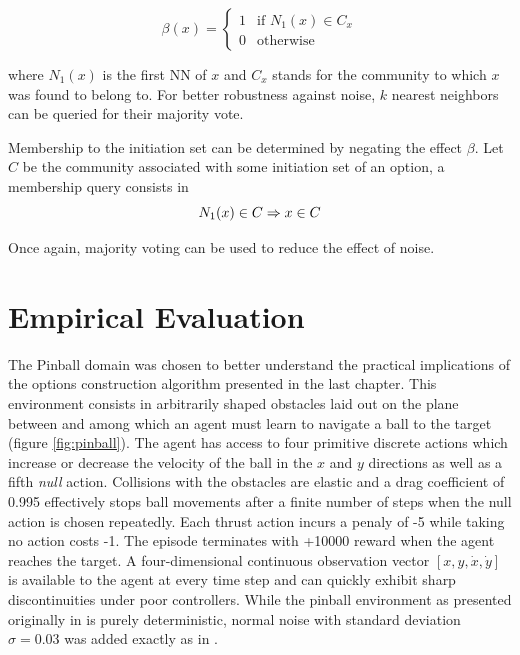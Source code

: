 \documentclass[12pt, oneside, extrafontsizes]{memoir}  %
\theoremstyle{plain}
\theoremstyle{definition}
\begin{document}
\begin{equation}
\beta(x) = 
\begin{cases}
1 & \text{if } N_1(x) \in C_x\\
0 & \text{otherwise}
\end{cases}
\end{equation}

where $N_1(x)$ is the first NN of $x$ and $C_x$ stands for the community to which $x$ was found to belong to. For better robustness against noise, $k$ nearest neighbors can be queried for their majority vote.

Membership to the initiation set can be determined by negating the effect $\beta$. Let $C$ be the community associated with some initiation set of an option, a membership query consists in
\begin{equation}
N_1(x) \in C \Rightarrow x \in C  \\
\end{equation}

Once again, majority voting can be used to reduce the effect of noise. 

\chapter{Empirical Evaluation}
The Pinball domain \cite{Konidaris2009} was chosen to better understand the practical implications of the options construction algorithm presented in the last chapter. This environment consists in arbitrarily shaped obstacles laid out on the plane between and among which an agent must learn to navigate a ball to the target (figure \ref{fig:pinball}). The agent has access to four primitive discrete actions which increase or decrease the velocity of the ball in the $x$ and $y$ directions as well as a fifth \textit{null} action. Collisions with the obstacles are elastic and a drag coefficient of 0.995 effectively stops ball movements after a finite number of steps when the null action is chosen repeatedly. Each thrust action incurs a penaly of -5 while taking no action costs -1. The episode terminates with +10000 reward when the agent reaches  the target. A four-dimensional continuous observation vector $[ x, y, \dot{x}, \dot{y}]$ is available to the agent at every time step and can quickly exhibit sharp discontinuities under poor controllers. While the pinball environment as presented originally in \cite{Konidaris2009} is purely deterministic, normal noise with standard deviation $\sigma = 0.03$ was added exactly as in \cite{Tamar2013}. 
\end{document}
